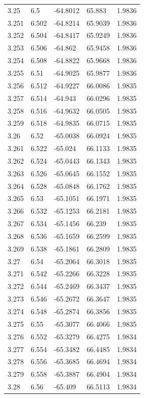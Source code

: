\begin{tabular}{lllll}
3.25 & 6.5 & -64.8012 & 65.883 & 1.9836 \\
3.251 & 6.502 & -64.8214 & 65.9039 & 1.9836 \\
3.252 & 6.504 & -64.8417 & 65.9249 & 1.9836 \\
3.253 & 6.506 & -64.862 & 65.9458 & 1.9836 \\
3.254 & 6.508 & -64.8822 & 65.9668 & 1.9836 \\
3.255 & 6.51 & -64.9025 & 65.9877 & 1.9836 \\
3.256 & 6.512 & -64.9227 & 66.0086 & 1.9835 \\
3.257 & 6.514 & -64.943 & 66.0296 & 1.9835 \\
3.258 & 6.516 & -64.9632 & 66.0505 & 1.9835 \\
3.259 & 6.518 & -64.9835 & 66.0715 & 1.9835 \\
3.26 & 6.52 & -65.0038 & 66.0924 & 1.9835 \\
3.261 & 6.522 & -65.024 & 66.1133 & 1.9835 \\
3.262 & 6.524 & -65.0443 & 66.1343 & 1.9835 \\
3.263 & 6.526 & -65.0645 & 66.1552 & 1.9835 \\
3.264 & 6.528 & -65.0848 & 66.1762 & 1.9835 \\
3.265 & 6.53 & -65.1051 & 66.1971 & 1.9835 \\
3.266 & 6.532 & -65.1253 & 66.2181 & 1.9835 \\
3.267 & 6.534 & -65.1456 & 66.239 & 1.9835 \\
3.268 & 6.536 & -65.1659 & 66.2599 & 1.9835 \\
3.269 & 6.538 & -65.1861 & 66.2809 & 1.9835 \\
3.27 & 6.54 & -65.2064 & 66.3018 & 1.9835 \\
3.271 & 6.542 & -65.2266 & 66.3228 & 1.9835 \\
3.272 & 6.544 & -65.2469 & 66.3437 & 1.9835 \\
3.273 & 6.546 & -65.2672 & 66.3647 & 1.9835 \\
3.274 & 6.548 & -65.2874 & 66.3856 & 1.9835 \\
3.275 & 6.55 & -65.3077 & 66.4066 & 1.9835 \\
3.276 & 6.552 & -65.3279 & 66.4275 & 1.9834 \\
3.277 & 6.554 & -65.3482 & 66.4485 & 1.9834 \\
3.278 & 6.556 & -65.3685 & 66.4694 & 1.9834 \\
3.279 & 6.558 & -65.3887 & 66.4904 & 1.9834 \\
3.28 & 6.56 & -65.409 & 66.5113 & 1.9834 \\

\end{tabular}
